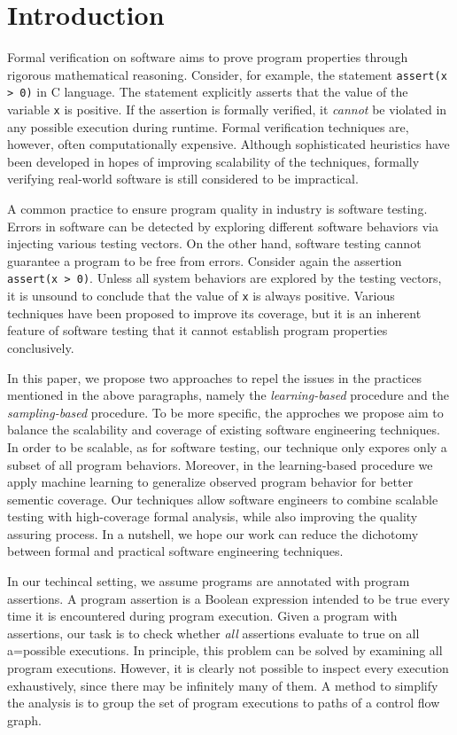 
\chapter{Introduction}\label{ch:introduction}

Formal verification on software aims to prove program properties through rigorous mathematical reasoning. Consider, for example, the statement \texttt{assert(x > 0)} in C language. The statement explicitly asserts that the value of the variable \texttt{x} is positive. If the assertion is formally verified, it \emph{cannot} be violated in any possible execution during runtime. Formal verification techniques are, however, often computationally expensive. Although sophisticated heuristics have been developed in hopes of improving scalability of the techniques, formally verifying real-world software is still considered to be impractical. 

A common practice to ensure program quality in industry is software testing. Errors in software can be detected by exploring different software behaviors via injecting various testing vectors. On the other hand, software testing cannot guarantee a program to be free from errors. Consider again the assertion \texttt{assert(x > 0)}. Unless all system behaviors are explored by the testing vectors, it is unsound to conclude that the value of \texttt{x} is always positive. Various techniques have been proposed to improve its coverage, but it is an inherent feature of software testing that it cannot establish program properties conclusively. 

In this paper, we propose two approaches to repel the issues in the practices mentioned in the above paragraphs, namely the \emph{learning-based} procedure and the \emph{sampling-based} procedure. To be more specific, the approches we propose aim to balance the scalability and coverage of existing software engineering techniques. In order to be scalable, as for software testing, our technique only expores only a subset of all program behaviors. Moreover, in the learning-based procedure we apply machine learning to generalize observed program behavior for better sementic coverage. Our techniques allow software engineers to combine scalable testing with high-coverage formal analysis, while also improving the quality assuring process. In a nutshell, we hope our work can reduce the dichotomy between formal and practical software engineering techniques. 

In our techincal setting, we assume programs are annotated with program assertions. A program assertion is a Boolean expression intended to be true every time it is encountered during program execution. Given a program with assertions, our task is to check whether 
\emph{all} assertions evaluate to true on all a=possible executions. In principle, this problem can be solved by examining all program executions. However, it is clearly not possible to inspect every execution exhaustively, since there may be infinitely many of them. A method to simplify the analysis is to group the set of program executions to paths of a control flow graph. 

